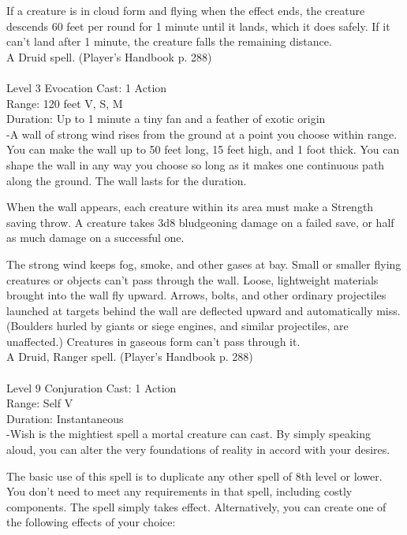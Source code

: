 \documentclass[10pt,twocolumn]{report}
\begin{document}
If a creature is in cloud form and flying when the effect ends, the creature descends 60 feet per round for 1 minute until it lands, which it does safely. If it can’t land after 1 minute, the creature falls the remaining distance.\\
A Druid spell. (Player's Handbook p. 288) \\


 \\
Level 3 \quad Evocation \quad Cast: 1 Action\\
Range: 120 feet \quad V, S, M\\
Duration: Up to 1 minute \quad a tiny fan and a feather of exotic origin\\
-A wall of strong wind rises from the ground at a point you choose within range.
You can make the wall up to 50 feet long, 15 feet high, and 1 foot thick. You can shape the wall in any way you choose so long as it makes one continuous path along the ground. The wall lasts for the duration.

When the wall appears, each creature within its area must make a Strength saving throw. A creature takes 3d8 bludgeoning damage on a failed save, or half as much damage on a successful one.

The strong wind keeps fog, smoke, and other gases at bay. Small or smaller flying creatures or objects can’t pass through the wall. Loose, lightweight materials brought into the wall fly upward. Arrows, bolts, and other ordinary projectiles launched at targets behind the wall are deflected upward and automatically miss. (Boulders hurled by giants or siege engines, and similar projectiles, are unaffected.) Creatures in gaseous form can’t pass through it.\\
A Druid, Ranger spell. (Player's Handbook p. 288) \\


 \\
Level 9 \quad Conjuration \quad Cast: 1 Action\\
Range: Self \quad V\\
Duration: Instantaneous \quad \\
-Wish is the mightiest spell a mortal creature can cast. By simply speaking aloud, you can alter the very foundations of reality in accord with your desires.

The basic use of this spell is to duplicate any other spell of 8th level or lower. You don’t need to meet any requirements in that spell, including costly components. The spell simply takes effect.
Alternatively, you can create one of the following effects of your choice:
\end{document}
